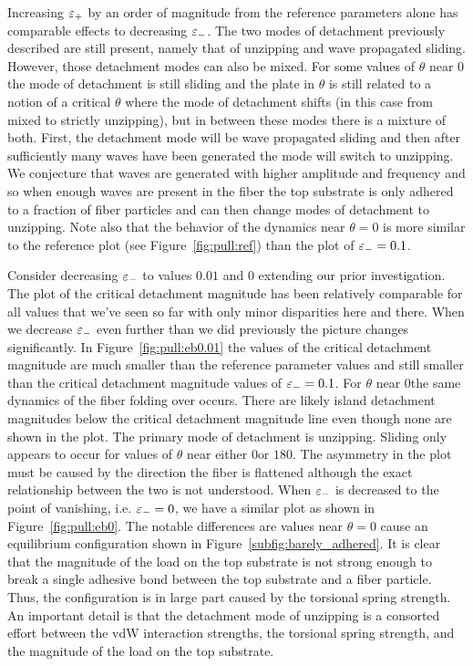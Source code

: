 Increasing $\varepsilon_+$ by an order of magnitude from the reference parameters alone has comparable effects to decreasing $\varepsilon_-$. The two modes of detachment previously described are still present, namely that of unzipping and wave propagated sliding. However, those detachment modes can also be mixed. For some values of $\theta$ near $0$\textdegree the mode of detachment is still sliding and the plate in $\theta$ is still related to a notion of a critical $\theta$ where the mode of detachment shifts (in this case from mixed to strictly unzipping), but in between these modes there is a mixture of both. First, the detachment mode will be wave propagated sliding and then after sufficiently many waves have been generated the mode will switch to unzipping. We conjecture that waves are generated with higher amplitude and frequency and so when enough waves are present in the fiber the top substrate is only adhered to a fraction of fiber particles and can then change modes of detachment to unzipping. Note also that the behavior of the dynamics near $\theta=0$ is more similar to the reference plot (see Figure~\ref{fig:pull:ref}) than the plot of $\varepsilon_-=0.1$.

Consider decreasing $\varepsilon_-$ to values $0.01$ and $0$ extending our prior investigation. The plot of the critical detachment magnitude has been relatively comparable for all values that we've seen so far with only minor disparities here and there. When we decrease $\varepsilon_-$ even further than we did previously the picture changes significantly. In Figure~\ref{fig:pull:eb0.01} the values of the critical detachment magnitude are much smaller than the reference parameter values and still smaller than the critical detachment magnitude values of $\varepsilon_-=0.1$. For $\theta$ near $0$\textdegree the same dynamics of the fiber folding over occurs. There are likely island detachment magnitudes below the critical detachment magnitude line even though none are shown in the plot. The primary mode of detachment is unzipping. Sliding only appears to occur for values of $\theta$ near either $0$\textdegree or $180$\textdegree. The asymmetry in the plot must be caused by the direction the fiber is flattened although the exact relationship between the two is not understood. When $\varepsilon_-$ is decreased to the point of vanishing, i.e. $\varepsilon_-=0$, we have a similar plot as shown in Figure~\ref{fig:pull:eb0}. The notable differences are values near $\theta=0$ cause an equilibrium configuration shown in Figure~\ref{subfig:barely_adhered}. It is clear that the magnitude of the load on the top substrate is not strong enough to break a single adhesive bond between the top substrate and a fiber particle. Thus, the configuration is in large part caused by the torsional spring strength. An important detail is that the detachment mode of unzipping is a consorted effort between the vdW interaction strengths, the torsional spring strength, and the magnitude of the load on the top substrate.

